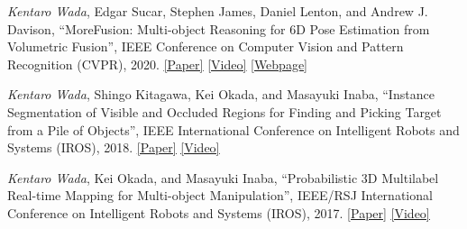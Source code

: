 \documentclass[letterpaper,MMMyyyy,nonstop]{simpleresumecv}
\begin{document}
\begin{body}
\BigGapNoBreak

\textit{Kentaro Wada}, Edgar Sucar, Stephen James, Daniel Lenton, and Andrew J.
Davison,
``MoreFusion: Multi-object Reasoning for 6D Pose Estimation from Volumetric
Fusion'',
IEEE Conference on Computer Vision and Pattern Recognition (CVPR), 2020.
\href{https://arxiv.org/abs/2004.04336}{\underline{[Paper]}}
\href{https://youtu.be/6oLUhuZL4ko}{\underline{[Video]}}
\href{https://morefusion.wkentaro.com}{\underline{[Webpage]}}

\BigGapNoBreak

\textit{Kentaro Wada}, Shingo Kitagawa, Kei Okada, and Masayuki Inaba,
``Instance Segmentation of Visible and Occluded Regions for Finding and Picking Target from a Pile of Objects'',
IEEE International Conference on Intelligent Robots and Systems (IROS), 2018.
\href{https://arxiv.org/abs/2001.07475}{\underline{[Paper]}}
\href{https://youtu.be/tNLtXb04i3w}{\underline{[Video]}}

\BigGapNoBreak

\textit{Kentaro Wada}, Kei Okada, and Masayuki Inaba,
``Probabilistic 3D Multilabel Real-time Mapping for Multi-object Manipulation'',
IEEE/RSJ International Conference on Intelligent Robots and Systems (IROS), 2017.
\href{https://arxiv.org/abs/2001.05752}{\underline{[Paper]}}
\href{https://youtu.be/T-vtVQT9sgc}{\underline{[Video]}}








\end{body}
\end{document}
